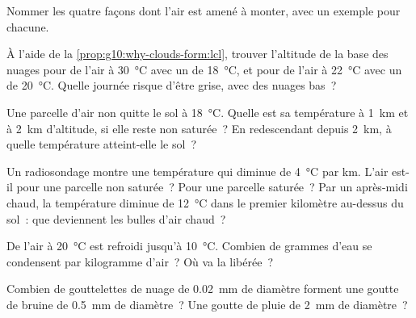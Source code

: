 \begin{exercise}[$\star$]\label{exo:g10:why-clouds-form:5}
Nommer les quatre façons dont l'air est amené à monter, avec un exemple pour
chacune.
\end{exercise}

\begin{exercise}[$\star\star$]\label{exo:g10:why-clouds-form:6}
À l'aide de la \cref{prop:g10:why-clouds-form:lcl}, trouver l'altitude de
la base des nuages pour de l'air à \qty{30}{\degreeCelsius} avec un  de \qty{18}{\degreeCelsius}, et pour de l'air à
\qty{22}{\degreeCelsius} avec un  de
\qty{20}{\degreeCelsius}. Quelle journée risque d'être grise, avec des
nuages bas~?
\end{exercise}

\begin{exercise}[$\star\star$]\label{exo:g10:why-clouds-form:7}
Une parcelle d'air non  quitte le sol à \qty{18}{\degreeCelsius}.
Quelle est sa température à \qty{1}{km} et à \qty{2}{km} d'altitude, si
elle reste non saturée~? En redescendant depuis \qty{2}{km}, à quelle
température atteint-elle le sol~?
\end{exercise}

\begin{exercise}[$\star\star$]\label{exo:g10:why-clouds-form:8}
Un radiosondage montre une température qui diminue de
\qty{4}{\degreeCelsius} par km. L'air est-il  pour une parcelle non
saturée~? Pour une parcelle saturée~? Par un après-midi chaud, la
température diminue de \qty{12}{\degreeCelsius} dans le premier kilomètre
au-dessus du sol~: que deviennent les bulles d'air chaud~?
\end{exercise}

\begin{exercise}[$\star\star$]\label{exo:g10:why-clouds-form:9}
De l'air  à \qty{20}{\degreeCelsius} est refroidi jusqu'à
\qty{10}{\degreeCelsius}. Combien de grammes d'eau se condensent par
kilogramme d'air~? Où va la  libérée~?
\end{exercise}

\begin{exercise}[$\star\star$]\label{exo:g10:why-clouds-form:10}
Combien de gouttelettes de nuage de \qty{0.02}{mm} de diamètre forment une
goutte de bruine de \qty{0.5}{mm} de diamètre~? Une goutte de pluie de
\qty{2}{mm} de diamètre~?
\end{exercise}

